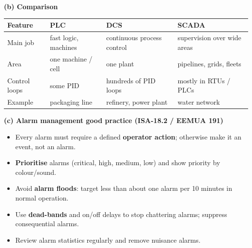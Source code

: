 \documentclass[11pt,a4paper]{article}
\begin{document}
\begin{enumerate}
\begin{answer}
			\textbf{(b) Comparison}
			\begin{center}
				\small
				\begin{tabular}{@{}p{2.5cm}p{3.6cm}p{3.6cm}p{4.0cm}@{}}
					\toprule
					\textbf{Feature} & \textbf{PLC} & \textbf{DCS} & \textbf{SCADA} \\
					\midrule
					Main job      & fast logic, machines   & continuous process control & supervision over wide areas \\
					Area          & one machine / cell     & one plant                  & pipelines, grids, fleets \\
					Control loops & some PID               & hundreds of PID loops      & mostly in RTUs / PLCs \\
					Example       & packaging line         & refinery, power plant      & water network \\
					\bottomrule
				\end{tabular}
			\end{center}

			\textbf{(c) Alarm management good practice (ISA-18.2 / EEMUA 191)}
			\begin{itemize}[itemsep=1pt]
				\item Every alarm must require a defined \textbf{operator action}; otherwise make it an event, not an alarm.
				\item \textbf{Prioritise} alarms (critical, high, medium, low) and show priority by colour/sound.
				\item Avoid \textbf{alarm floods}: target less than about one alarm per 10 minutes in normal operation.
				\item Use \textbf{dead-bands} and on/off delays to stop chattering alarms; suppress consequential alarms.
				\item Review alarm statistics regularly and remove nuisance alarms.
			\end{itemize}
		\end{answer}

	\end{enumerate}
\end{document}
